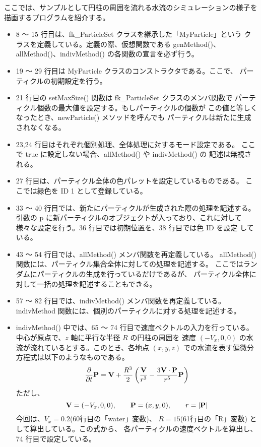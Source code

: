 ここでは、サンプルとして円柱の周囲を流れる水流のシミュレーションの様子を
描画するプログラムを紹介する。
\begin{itemize}
 \item 8 〜 15 行目は、fk\_ParticleSet クラスを継承した「MyParticle」という
	クラスを定義している。定義の際、仮想関数である genMethod()、
	allMethod()、indivMethod() の各関数の宣言を必ず行う。

 \item 19 〜 29 行目は MyParticle クラスのコンストラクタである。ここで、
	パーティクルの初期設定を行う。

 \item 21 行目の setMaxSize() 関数は fk\_ParticleSet クラスのメンバ関数で
	パーティクル個数の最大値を設定する。もしパーティクルの個数が
	この値と等しくなったとき、newParticle() メソッドを呼んでも
	パーティクルは新たに生成されなくなる。

 \item 23,24 行目はそれぞれ個別処理、全体処理に対するモード設定である。
	ここで true に設定しない場合、allMethod() や indivMethod() の
	記述は無視される。

 \item 27 行目は、パーティクル全体の色パレットを設定しているものである。
	ここでは緑色を ID 1 として登録している。

 \item 33 〜 40 行目では、新たにパーティクルが生成された際の処理を記述する。
	引数の p に新パーティクルのオブジェクトが入っており、これに対して
	様々な設定を行う。36 行目では初期位置を、38 行目では色 ID を設定
	している。

 \item 43 〜 54 行目では、allMethod() メンバ関数を再定義している。
	allMethod() 関数には、パーティクル集合全体に対しての処理を記述する。
	ここではランダムにパーティクルの生成を行っているだけであるが、
	パーティクル全体に対して一括の処理を記述することもできる。

 \item 57 〜 82 行目では、indivMethod() メンバ関数を再定義している。
	indivMethod 関数には、個別のパーティクルに対する処理を記述する。

 \item indivMethod() 中では、65 〜 74 行目で速度ベクトルの入力を行っている。
	中心が原点で、\(z\) 軸に平行な半径 \(R\) の円柱の周囲を
	速度 \((-V_x, 0, 0)\) の水流が流れているとする。このとき、各地点
	\((x, y, z)\) での水流を表す偏微分方程式は以下のようなものである。
	\[
		\frac{\partial}{\partial t}\mathbf{P} =
		\mathbf{V} + \frac{R^3}{2}
		\left(\frac{\mathbf{V}}{r^3} -
		\frac{3 \mathbf{V} \cdot \mathbf{P}}{r^5} \mathbf{P} \right)
	\]
	ただし、
	\[
		\mathbf{V} = (-V_x, 0, 0), \qquad
		\mathbf{P} = (x, y, 0), \qquad r = |\mathbf{P}|
	\]
	今回は、\(V_x = 0.2\)(60行目の「water」変数)、
	\(R = 15\)(61行目の「R」変数) として算出している。この式から、
	各パーティクルの速度ベクトルを算出し、74 行目で設定している。


\end{itemize}
